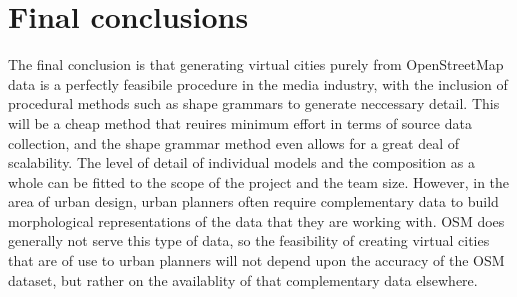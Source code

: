 \documentclass{kththesis}
\begin{document}
\section{Final conclusions}

The final conclusion is that generating virtual cities purely from OpenStreetMap data is a perfectly feasibile procedure in the media industry, with the inclusion of procedural methods such as shape grammars to generate neccessary detail.
This will be a cheap method that reuires minimum effort in terms of source data collection, and the shape grammar method even allows for a great deal of scalability.
The level of detail of individual models and the composition as a whole can be fitted to the scope of the project and the team size.
However, in the area of urban design, urban planners often require complementary data to build morphological representations of the data that they are working with.
OSM does generally not serve this type of data, so the feasibility of creating virtual cities that are of use to urban planners will not depend upon the accuracy of the OSM dataset, but rather on the availablity of that complementary data elsewhere.
\end{document}

